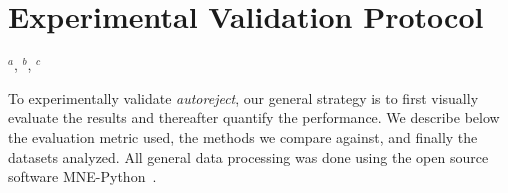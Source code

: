 \section{Experimental Validation Protocol}

\begin{table}[tb]
{
    \caption{Overview of rejection strategies evaluated\label{tab:strategies}}
       \begin{center}
        \label{table:methods}
        \end{center}
        \hspace{1em}
        {\footnotesize
         $^a$\cite{nolan2010faster}, $^b$\cite{de2008sensor},  $^c$\cite{bigdely2015prep}}
}
\end{table}

To experimentally validate \emph{autoreject}, our general strategy is to first visually evaluate the results and thereafter quantify the performance. We describe below the evaluation metric used, the methods we compare against, and finally the datasets analyzed. All general data processing was done using the open source software MNE-Python~\citep{gramfort2013meg}.

